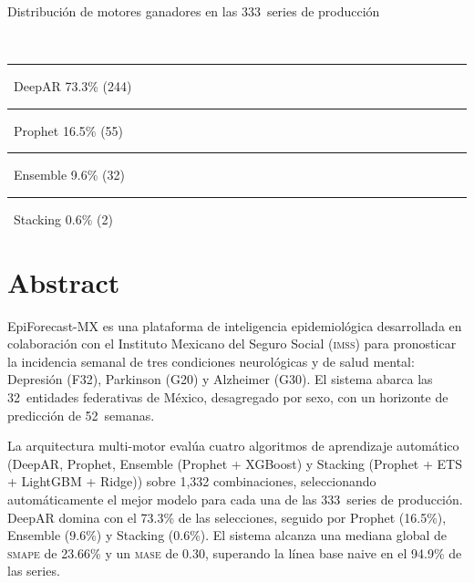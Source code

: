 \documentclass[12pt, letterpaper]{article}
\newcommand{\smape}{\textnormal{\textsc{smape}}}
\newcommand{\mase}{\textnormal{\textsc{mase}}}
\newcommand{\imss}{\textnormal{\textsc{imss}}}
\begin{document}
\begin{center}
{\color{coolgray}\small Distribución de motores ganadores en las 333~series de producción}\\[0.3cm]
\\[0.2cm]
{\scriptsize\color{coolgray}
\textcolor{cdeepar}{\rule{8pt}{8pt}}~DeepAR 73.3\% (244) \quad
\textcolor{cprophet}{\rule{8pt}{8pt}}~Prophet 16.5\% (55) \quad
\textcolor{censemble}{\rule{8pt}{8pt}}~Ensemble 9.6\% (32) \quad
\textcolor{cstacking}{\rule{8pt}{8pt}}~Stacking 0.6\% (2)}
\end{center}

\newpage

\section*{Abstract}\label{sec:abstract}

EpiForecast-MX es una plataforma de inteligencia epidemiológica desarrollada en colaboración con el Instituto Mexicano del Seguro Social (\imss{}) para pronosticar la incidencia semanal de tres condiciones neurológicas y de salud mental: Depresión (F32), Parkinson (G20) y Alzheimer (G30). El sistema abarca las 32~entidades federativas de México, desagregado por sexo, con un horizonte de predicción de 52~semanas.

La arquitectura multi-motor evalúa cuatro algoritmos de aprendizaje automático (DeepAR, Prophet, Ensemble (Prophet + XGBoost) y Stacking (Prophet + ETS + LightGBM + Ridge)) sobre 1,332 combinaciones, seleccionando automáticamente el mejor modelo para cada una de las 333~series de producción. DeepAR domina con el 73.3\% de las selecciones, seguido por Prophet (16.5\%), Ensemble (9.6\%) y Stacking (0.6\%). El sistema alcanza una mediana global de \smape{} de 23.66\% y un \mase{} de 0.30, superando la línea base naive en el 94.9\% de las series.
\end{document}
